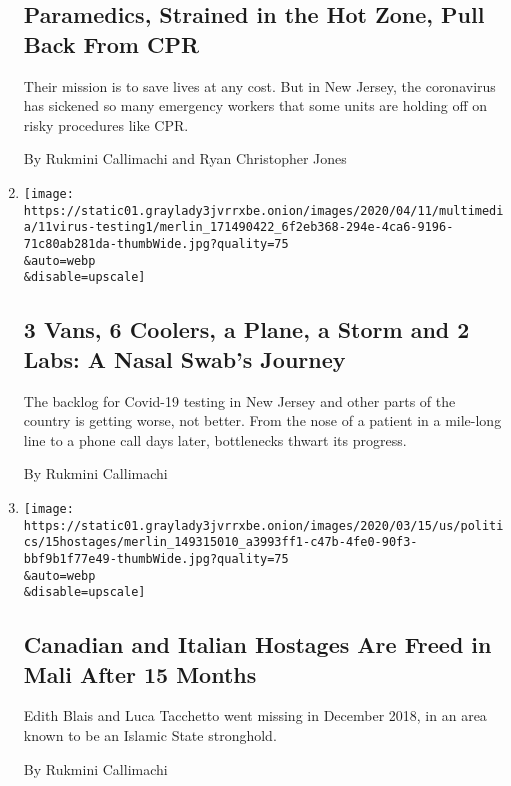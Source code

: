 \begin{enumerate}
  \hypertarget{paramedics-strained-in-the-hot-zone-pull-back-from-cpr}{%
  \subsection{Paramedics, Strained in the Hot Zone, Pull Back From
  CPR}\label{paramedics-strained-in-the-hot-zone-pull-back-from-cpr}}

  Their mission is to save lives at any cost. But in New Jersey, the
  coronavirus has sickened so many emergency workers that some units are
  holding off on risky procedures like CPR.

  By Rukmini Callimachi and Ryan Christopher Jones
\item
  \href{/2020/04/13/nyregion/coronavirus-testing.html}{}

  \texttt{[image: https://static01.graylady3jvrrxbe.onion/images/2020/04/11/multimedia/11virus-testing1/merlin\_171490422\_6f2eb368-294e-4ca6-9196-71c80ab281da-thumbWide.jpg?quality=75\\\&auto=webp\\\&disable=upscale]}

  \hypertarget{3-vans-6-coolers-a-plane-a-storm-and-2-labs-a-nasal-swabs-journey}{%
  \subsection{3 Vans, 6 Coolers, a Plane, a Storm and 2 Labs: A Nasal
  Swab's
  Journey}\label{3-vans-6-coolers-a-plane-a-storm-and-2-labs-a-nasal-swabs-journey}}

  The backlog for Covid-19 testing in New Jersey and other parts of the
  country is getting worse, not better. From the nose of a patient in a
  mile-long line to a phone call days later, bottlenecks thwart its
  progress.

  By Rukmini Callimachi
\item
  \href{/2020/03/14/world/africa/mali-hostages-released.html}{}

  \texttt{[image: https://static01.graylady3jvrrxbe.onion/images/2020/03/15/us/politics/15hostages/merlin\_149315010\_a3993ff1-c47b-4fe0-90f3-bbf9b1f77e49-thumbWide.jpg?quality=75\\\&auto=webp\\\&disable=upscale]}

  \hypertarget{canadian-and-italian-hostages-are-freed-in-mali-after-15-months}{%
  \subsection{Canadian and Italian Hostages Are Freed in Mali After 15
  Months}\label{canadian-and-italian-hostages-are-freed-in-mali-after-15-months}}

  Edith Blais and Luca Tacchetto went missing in December 2018, in an
  area known to be an Islamic State stronghold.

  By Rukmini Callimachi
\end{enumerate}

